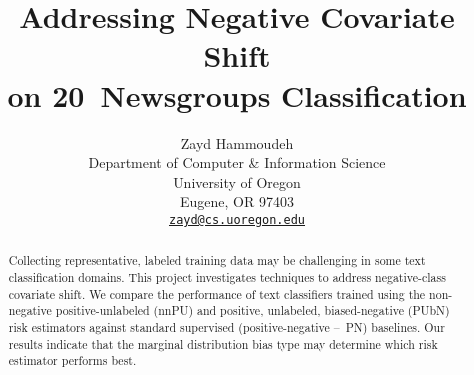 \documentclass{article}
\title{Addressing Negative Covariate Shift \\ on 20~Newsgroups Classification}
\author{%
  Zayd Hammoudeh \\
  Department of Computer \& Information Science \\
  University of Oregon \\
  Eugene, OR 97403 \\
  \texttt{\href{mailto:zayd@cs.uoregon.edu}{zayd@cs.uoregon.edu}}
}
\begin{document}
\maketitle

\begin{abstract}
  Collecting representative, labeled training data may be challenging in some text classification domains. This project investigates techniques to address negative-class covariate shift.  We compare the performance of text classifiers trained using the non-negative positive-unlabeled (nnPU) and positive, unlabeled, biased-negative (PUbN) risk estimators against standard supervised (positive-negative --~PN) baselines. Our results indicate that the marginal distribution bias type may determine which risk estimator performs best.
\end{abstract}










\end{document}
